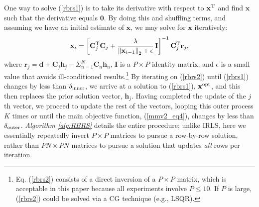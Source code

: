 \documentclass[final]{siamltex}
\newcommand{\la}[1]{\mbox{$\mathbf{#1}$}}  \newcommand{\sst}[1]{\mbox{\scriptsize{#1}}}
\begin{document}
    One way to solve (\ref{rbrs1}) is to take its derivative with
    respect to $\la{x}^{\sst{T}}$ and find $\la{x}$ such that the
    derivative equals $\la{0}$.  By doing this and shuffling terms,
    and assuming we have an initial estimate of $\la{x}$, we may solve
    for $\la{x}$ iteratively:
    \begin{equation}\label{rbrs2}
         \la{x}_i = \left [ \la{C}_j^{\sst{T}} \la{C}_j + 
                 \frac{\lambda}{\left \Vert \la{x}_{i-1} \right \Vert_2 + \epsilon}\, \la{I} \right ]^{-1} 
                        \la{C}_j^{\sst{T}} \la{r}_j,
    \end{equation}
    where $\la{r}_j = \la{d} + \la{C}_j \la{h}_j - \Sigma_{n=1}^N
    \la{C}_n \la{h}_n$, $\la{I}$ is a $P \times P$ identity matrix,
    and $\epsilon$ is a small value that avoids ill-conditioned
    results.\footnote{Eq. (\ref{rbrs2}) consists of a direct inversion
    of a $P \times P$ matrix, which is acceptable in this paper
    because all experiments involve $P \leq 10$.  If $P$ is large,
    (\ref{rbrs2}) could be solved via a CG technique
    (e.g., LSQR).}  By iterating on (\ref{rbrs2}) until (\ref{rbrs1})
    changes by less than $\delta_{\sst{inner}}$, we arrive at a
    solution to (\ref{rbrs1}), $\la{x}^{\sst{opt}}$, and this then
    replaces the prior solution vector, $\la{h}_j$.  Having completed
    the update of the $j$th vector, we proceed to update the rest of
    the vectors, looping this outer process $K$ times or until the
    main objective function, (\ref{mmv2_eq4}), changes by less than
    $\delta_{\sst{outer}}$.  {\em{Algorithm \ref{alg:RBRS}}} details
    the entire procedure; unlike IRLS, here we essentially repeatedly
    invert $P \times P$ matrices to pursue a row-by-row solution,
    rather than $PN \times PN$ matrices to pursue a solution that
    updates {\em{all}} rows per iteration.
\end{document}
